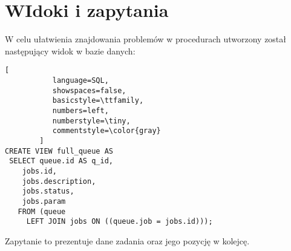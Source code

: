 \documentclass[paper=a4, fontsize=11pt]{scrartcl} %
\numberwithin{equation}{section} %
\numberwithin{figure}{section} %
\numberwithin{table}{section} %
\begin{document}
\newpage
\section {WIdoki i zapytania}


W celu ułatwienia znajdowania problemów w procedurach utworzony został następujący widok w bazie danych:


\begin{lstlisting}[
           language=SQL,
           showspaces=false,
           basicstyle=\ttfamily,
           numbers=left,
           numberstyle=\tiny,
           commentstyle=\color{gray}
        ]
CREATE VIEW full_queue AS
 SELECT queue.id AS q_id,
    jobs.id,
    jobs.description,
    jobs.status,
    jobs.param
   FROM (queue
     LEFT JOIN jobs ON ((queue.job = jobs.id)));
\end{lstlisting}

Zapytanie to prezentuje dane zadania oraz jego pozycję w kolejcę.
\end{document}
